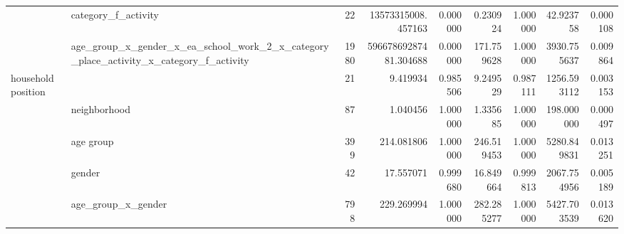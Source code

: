 \begin{tabular}{ll|r|rr|rr|rr}
 & category_f_activity & 22 & 13573315008.457163 & 0.000000 & 0.230924 & 1.000000 & 42.923758 & 0.000108 \\
 & age_group_x_gender_x_ea_school_work_2_x_category_place_activity_x_category_f_activity & 1980 & 59667869287481.304688 & 0.000000 & 171.759628 & 1.000000 & 3930.755637 & 0.009864 \\
\cline{1-9}
\multirow[t]{5}{*}{household position} &  & 21 & 9.419934 & 0.985506 & 9.249529 & 0.987111 & 1256.593112 & 0.003153 \\
 & neighborhood & 87 & 1.040456 & 1.000000 & 1.335685 & 1.000000 & 198.000000 & 0.000497 \\
 & age group & 399 & 214.081806 & 1.000000 & 246.519453 & 1.000000 & 5280.849831 & 0.013251 \\
 & gender & 42 & 17.557071 & 0.999680 & 16.849664 & 0.999813 & 2067.754956 & 0.005189 \\
 & age_group_x_gender & 798 & 229.269994 & 1.000000 & 282.285277 & 1.000000 & 5427.703539 & 0.013620 \\
\cline{1-9}
\bottomrule
\end{tabular}
